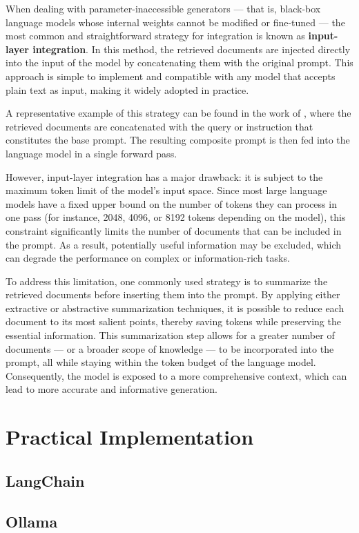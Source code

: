 When dealing with parameter-inaccessible generators — that is, black-box language models whose internal weights cannot be modified or fine-tuned — the most common and straightforward strategy for integration is known as \textbf{input-layer integration}. In this method, the retrieved documents are injected directly into the input of the model by concatenating them with the original prompt. This approach is simple to implement and compatible with any model that accepts plain text as input, making it widely adopted in practice.

A representative example of this strategy can be found in the work of \cite{inContextR}, where the retrieved documents are concatenated with the query or instruction that constitutes the base prompt. The resulting composite prompt is then fed into the language model in a single forward pass.

However, input-layer integration has a major drawback: it is subject to the maximum token limit of the model’s input space. Since most large language models have a fixed upper bound on the number of tokens they can process in one pass (for instance, 2048, 4096, or 8192 tokens depending on the model), this constraint significantly limits the number of documents that can be included in the prompt. As a result, potentially useful information may be excluded, which can degrade the performance on complex or information-rich tasks.

To address this limitation, one commonly used strategy is to summarize the retrieved documents before inserting them into the prompt. By applying either extractive or abstractive summarization techniques, it is possible to reduce each document to its most salient points, thereby saving tokens while preserving the essential information. This summarization step allows for a greater number of documents — or a broader scope of knowledge — to be incorporated into the prompt, all while staying within the token budget of the language model. Consequently, the model is exposed to a more comprehensive context, which can lead to more accurate and informative generation.

\section{Practical Implementation}
    \subsection{LangChain}
    \subsection{Ollama}
